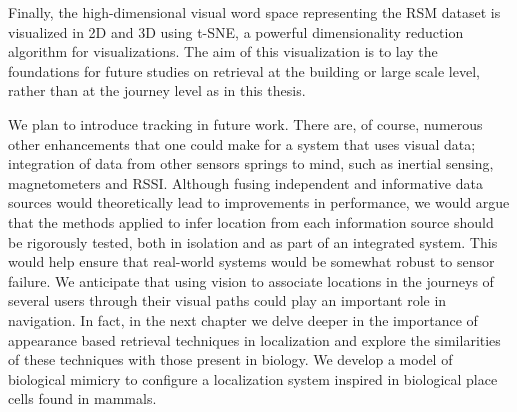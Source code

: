 Finally, the high-dimensional visual word space representing the RSM dataset is visualized in 2D and 3D using t-SNE, a powerful dimensionality reduction algorithm for visualizations. The aim of this visualization is to lay the foundations for future studies on retrieval at the building or large scale level, rather than at the journey level as in this thesis.

We plan to introduce tracking in future work. There are, of course, numerous other enhancements that one could make for a system that uses visual data; integration of data from other sensors springs to mind, such as inertial sensing, magnetometers and RSSI.  Although fusing independent and informative data sources would theoretically lead to improvements in performance, we would argue that the methods applied to infer location from each information source should be rigorously tested, both in isolation and as part of an integrated system.  This would help ensure that real-world systems would be somewhat robust to sensor failure. We anticipate that using vision to associate locations in the journeys of several users through their visual paths could play an important role in navigation. In fact, in the next chapter we delve deeper in the importance of appearance based retrieval techniques in localization and explore the similarities of these techniques with those present in biology. We develop a model of biological mimicry to configure a localization system inspired in biological place cells found in mammals.


\label{sec:conclusion}


